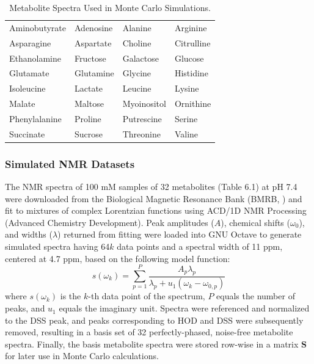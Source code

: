 \begin{table}[h!]
\caption{Metabolite Spectra Used in Monte Carlo Simulations.}
\begin{center}
\begin{tabular}{l l l l}
  \hline
  Aminobutyrate & Adenosine & Alanine     & Arginine   \\
  Asparagine    & Aspartate & Choline     & Citrulline \\
  Ethanolamine  & Fructose  & Galactose   & Glucose    \\
  Glutamate     & Glutamine & Glycine     & Histidine  \\
  Isoleucine    & Lactate   & Leucine     & Lysine     \\
  Malate        & Maltose   & Myoinositol & Ornithine  \\
  Phenylalanine & Proline   & Putrescine  & Serine     \\
  Succinate     & Sucrose   & Threonine   & Valine
\end{tabular}
\end{center}
\end{table}

\subsubsection{Simulated NMR Datasets}

\begin{doublespace}
The \hnmr{} NMR spectra of 100 mM samples of 32 metabolites (Table 6.1) at
pH 7.4 were downloaded from the Biological Magnetic Resonance Bank
(BMRB, \cite{ulrich:nar2008}) and fit to mixtures of complex Lorentzian
functions using ACD/1D NMR Processing (Advanced Chemistry Development).
Peak amplitudes ($A$), chemical shifts ($\omega_0$), and widths ($\lambda$)
returned from fitting were loaded into GNU Octave to generate simulated spectra
having 64$k$ data points and a spectral width of 11 ppm, centered at
4.7 ppm, based on the following model function:
\begin{equation}
s(\omega_k) =
 \sum_{p=1}^P
 \frac{A_p \lambda_p}
      {\lambda_p + u_1 (\omega_k - \omega_{0,p})}
\end{equation}
where $s(\omega_k)$ is the $k$-th data point of the spectrum, $P$ equals the
number of peaks, and $u_1$ equals the imaginary unit. Spectra were referenced
and normalized to the DSS peak, and peaks corresponding to HOD and DSS were
subsequently removed, resulting in a basis set of 32 perfectly-phased,
noise-free metabolite spectra. Finally, the basis metabolite spectra were
stored row-wise in a matrix $\mathbf{S}$ for later use in Monte Carlo
calculations.
\end{doublespace}

